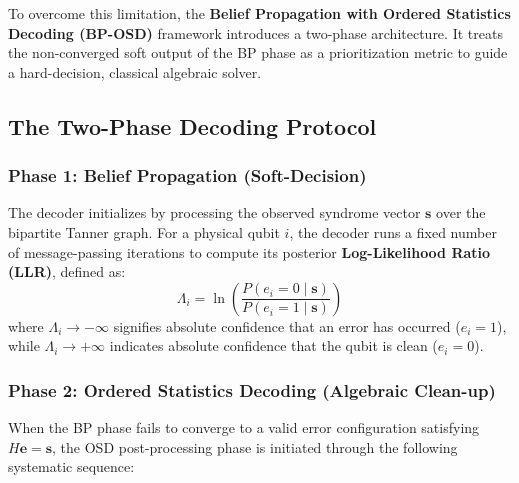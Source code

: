 To overcome this limitation, the \textbf{Belief Propagation with Ordered Statistics Decoding (BP-OSD)} framework introduces a two-phase architecture. It treats the non-converged soft output of the BP phase as a prioritization metric to guide a hard-decision, classical algebraic solver.

\subsection{The Two-Phase Decoding Protocol}

\subsubsection{Phase 1: Belief Propagation (Soft-Decision)}
The decoder initializes by processing the observed syndrome vector $\mathbf{s}$ over the bipartite Tanner graph. For a physical qubit $i$, the decoder runs a fixed number of message-passing iterations to compute its posterior \textbf{Log-Likelihood Ratio (LLR)}, defined as:
\begin{equation}
    \Lambda_i = \ln \left( \frac{P(e_i = 0 \mid \mathbf{s})}{P(e_i = 1 \mid \mathbf{s})} \right)
\end{equation}
where $\Lambda_i \to -\infty$ signifies absolute confidence that an error has occurred ($e_i = 1$), while $\Lambda_i \to +\infty$ indicates absolute confidence that the qubit is clean ($e_i = 0$).

\subsubsection{Phase 2: Ordered Statistics Decoding (Algebraic Clean-up)}
When the BP phase fails to converge to a valid error configuration satisfying $H\mathbf{e} = \mathbf{s}$, the OSD post-processing phase is initiated through the following systematic sequence:

